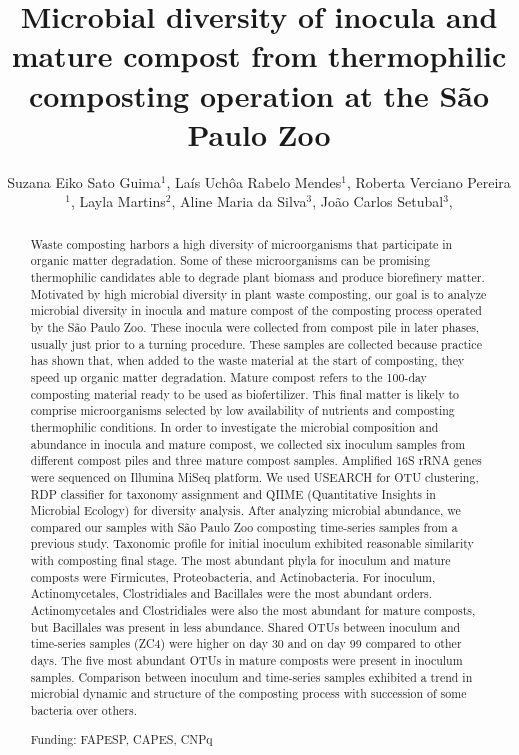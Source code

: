 \documentclass[twoside]{article}
\title{\vspace{-15mm}\fontsize{24pt}{10pt}\selectfont\textbf{ Microbial diversity of inocula and mature compost from thermophilic composting operation at the S\~ao Paulo Zoo }} %
\author{ Suzana Eiko Sato Guima$^{1}$, Laís Uchôa Rabelo Mendes$^{1}$, Roberta Verciano Pereira$^{1}$, Layla Martins$^{2}$, Aline Maria da Silva$^{3}$, João Carlos Setubal$^{3}$, }
\affil{ 1 University of São Paulo

2 Universidade de São Paulo

3 USP

 }
\date{}
\begin{document}
  
  
  \maketitle %
  
  
  \thispagestyle{fancy} %
  
  
  \begin{abstract}
  Waste composting harbors a high diversity of microorganisms that participate in organic matter degradation. Some of these microorganisms can be promising thermophilic candidates able to degrade plant biomass and produce biorefinery matter. Motivated by high microbial diversity in plant waste composting, our goal is to analyze microbial diversity in inocula and mature compost of the composting process operated by the S\~ao Paulo Zoo. These inocula were collected from compost pile in later phases, usually just prior to a turning procedure. These samples are collected because practice has shown that, when added to the waste material at the start of composting, they speed up organic matter degradation. Mature compost refers to the 100-day composting material ready to be used as biofertilizer. This final matter is likely to comprise microorganisms selected by low availability of nutrients and composting thermophilic conditions. In order to investigate the microbial composition and abundance in inocula and mature compost, we collected six inoculum samples from different compost piles and three mature compost samples. Amplified 16S rRNA genes were sequenced on Illumina MiSeq platform. We used USEARCH for OTU clustering, RDP classifier for taxonomy assignment and QIIME (Quantitative Insights in Microbial Ecology) for diversity analysis. After analyzing microbial abundance, we compared our samples with S\~ao Paulo Zoo composting time-series samples from a previous study. Taxonomic profile for initial inoculum exhibited reasonable similarity with composting final stage. The most abundant phyla for inoculum and mature composts were Firmicutes, Proteobacteria, and Actinobacteria. For inoculum, Actinomycetales, Clostridiales and Bacillales were the most abundant orders. Actinomycetales and Clostridiales were also the most abundant for mature composts, but Bacillales was present in less abundance. Shared OTUs between inoculum and time-series samples (ZC4) were higher on day 30 and on day 99 compared to other days. The five most abundant OTUs in mature composts were present in inoculum samples. Comparison between inoculum and time-series samples exhibited a trend in microbial dynamic and structure of the composting process with succession of some bacteria over others.
  
  Funding: FAPESP, CAPES, CNPq \\ 
  \end{abstract}
  
\end{document}
